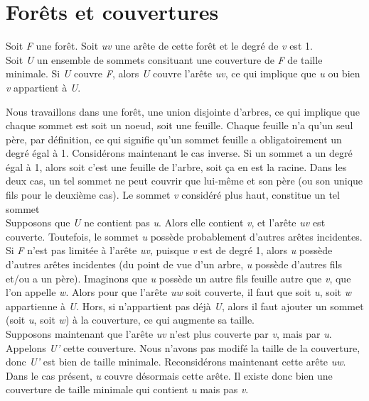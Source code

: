 
\section{For\^ets et couvertures}

Soit \textit{F} une for\^et. Soit \textit{uv} une ar\^ete de cette for\^et et le degr\'e de \textit{v} est 1.\\

Soit \textit{U} un ensemble de sommets consituant une couverture de \textit{F} de taille minimale. Si \textit{U}
couvre \textit{F}, alors \textit{U} couvre l'ar\^ete \textit{uv}, ce qui implique que \textit{u} ou bien \textit{v}
appartient \`a \textit{U}.

Nous travaillons dans une for\^et, une union disjointe d'arbres, ce qui implique que chaque sommet est soit un noeud,
soit une feuille. Chaque feuille n'a qu'un seul p\`ere, par d\'efinition, ce qui signifie qu'un sommet feuille a
obligatoirement un degr\'e \'egal \`a 1. Consid\'erons maintenant le cas inverse. Si un sommet a un degr\'e \'egal \`a
1, alors soit c'est une feuille de l'arbre, soit \c{c}a en est la racine. Dans les deux cas, un tel sommet ne peut
couvrir que lui-m\^eme et son p\`ere (ou son unique fils pour le deuxi\`eme cas). Le sommet \textit{v} consid\'er\'e
plus haut, constitue un tel sommet\\

Supposons que \textit{U} ne contient pas \textit{u}. Alors elle contient \textit{v}, et l'ar\^ete \textit{uv} est
couverte. Toutefois, le sommet \textit{u} poss\`ede probablement d'autres ar\^etes incidentes. Si \textit{F} n'est pas
limit\'ee \`a l'ar\^ete \textit{uv}, puisque \textit{v} est de degr\'e 1, alors \textit{u} poss\`ede d'autres ar\^etes
incidentes (du point de vue d'un arbre, \textit{u} poss\`ede d'autres fils et/ou a un p\`ere). Imaginons que \textit{u}
poss\`ede un autre fils feuille autre que \textit{v}, que l'on appelle \textit{w}. Alors pour que l'ar\^ete \textit{uw}
soit couverte, il faut que soit \textit{u}, soit \textit{w} appartienne \`a \textit{U}. Hors, si  n'appartient
pas d\'ej\`a \textit{U}, alors il faut ajouter un sommet (soit \textit{u}, soit \textit{w}) \`a la couverture, ce qui
augmente sa taille.\\

Supposons maintenant que l'ar\^ete \textit{uv} n'est plus couverte par \textit{v}, mais par \textit{u}. Appelons \textit{U'}
cette couverture. Nous n'avons pas modif\'e la taille de la couverture, donc \textit{U'} est bien de taille minimale.
Reconsid\'erons maintenant cette ar\^ete \textit{uw}. Dans le cas pr\'esent, \textit{u} couvre d\'esormais cette ar\^ete.
Il existe donc bien une couverture de taille minimale qui contient \textit{u} mais pas \textit{v}.


